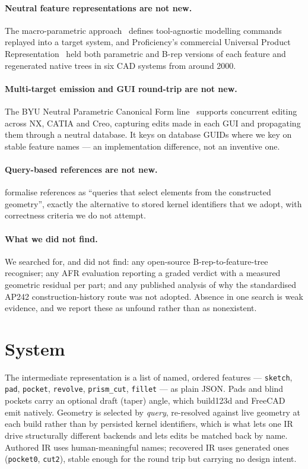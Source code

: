 \documentclass[11pt]{article}
\newcommand{\code}[1]{\texttt{\small #1}}
\begin{document}
\paragraph{Neutral feature representations are not new.} The macro-parametric
approach~\citep{TODO-mun-han} defines tool-agnostic modelling commands replayed
into a target system, and Proficiency's commercial Universal Product
Representation~\citep{TODO-rappoport} held both parametric and B-rep versions of
each feature and regenerated native trees in six CAD systems from around 2000.

\paragraph{Multi-target emission and GUI round-trip are not new.} The BYU Neutral
Parametric Canonical Form line~\citep{TODO-shumway} supports concurrent editing
across NX, CATIA and Creo, capturing edits made in each GUI and propagating them
through a neutral database. It keys on database GUIDs where we key on stable
feature names --- an implementation difference, not an inventive one.

\paragraph{Query-based references are not new.} \citet{TODO-cascaval} formalise
references as ``queries that select elements from the constructed geometry'',
exactly the alternative to stored kernel identifiers that we adopt, with
correctness criteria we do not attempt.

\paragraph{What we did not find.} We searched for, and did not find: any
open-source B-rep-to-feature-tree recogniser; any AFR evaluation reporting a
graded verdict with a measured geometric residual per part; and any published
analysis of why the standardised AP242 construction-history route was not
adopted. Absence in one search is weak evidence, and we report these as unfound
rather than as nonexistent.

\section{System}
\label{sec:system}

The intermediate representation is a list of named, ordered features ---
\code{sketch}, \code{pad}, \code{pocket}, \code{revolve}, \code{prism\_cut},
\code{fillet} --- as plain JSON. Pads and blind pockets carry an optional draft
(taper) angle, which build123d and FreeCAD emit natively. Geometry is selected by \emph{query},
re-resolved against live geometry at each build rather than by persisted kernel
identifiers, which is what lets one IR drive structurally different backends and
lets edits be matched back by name. Authored IR uses human-meaningful names;
recovered IR uses generated ones (\code{pocket0}, \code{cut2}), stable enough
for the round trip but carrying no design intent.
\end{document}
